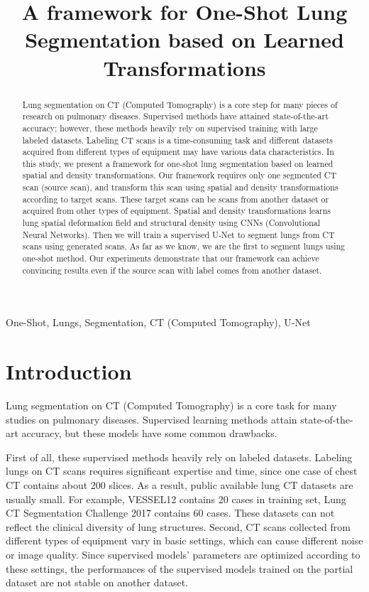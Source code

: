 \documentclass{article}
\title{A framework for One-Shot Lung Segmentation based on Learned Transformations
  }
\begin{document}
%
\maketitle
%
\begin{abstract}
    Lung segmentation on CT (Computed Tomography) is a core step for many pieces of research on pulmonary diseases. Supervised methods have attained state-of-the-art accuracy; however, these methods heavily rely on supervised training with large labeled datasets. Labeling CT scans is a time-consuming task and different datasets acquired from different types of equipment may have various data characteristics.
    In this study, we present a framework for one-shot lung segmentation based on learned spatial and density transformations.
    Our framework requires only one segmented CT scan (source scan), and transform this scan using spatial and density transformations according to target scans. These target scans can be scans from another dataset or acquired from other types of equipment.
    Spatial and density transformations learns lung spatial deformation field and structural density using CNNs (Convolutional Neural Networks). Then we will train a supervised U-Net to segment lungs from CT scans using generated scans.
    As far as we know, we are the first to segment lungs using one-shot method.
    Our experiments demonstrate that our framework can achieve convincing results even if the source scan with label comes from another dataset.

\end{abstract}
%
\begin{keywords}
One-Shot, Lungs, Segmentation, CT (Computed Tomography), U-Net
\end{keywords}
%
\section{Introduction}
\label{sec:intro}

Lung segmentation on CT (Computed Tomography) is a core task for many studies on pulmonary diseases. Supervised learning methods attain state-of-the-art accuracy, but these models have some common drawbacks.

First of all, these supervised methods heavily rely on labeled datasets. Labeling lungs on CT scans requires significant expertise and time, since one case of chest CT contains about 200 slices. As a result, public available lung CT datasets are usually small. For example, VESSEL12 \cite{rudyanto2014comparing} contains 20 cases in training set, Lung CT Segmentation Challenge 2017 \cite{yang2017data} contains 60 cases. These datasets can not reflect the clinical diversity of lung structures.
Second, CT scans collected from different types of equipment vary in basic settings, which can cause different noise or image quality. Since supervised models' parameters are optimized according to these settings, the performances of the supervised models trained on the partial dataset are not stable on another dataset.
\end{document}
